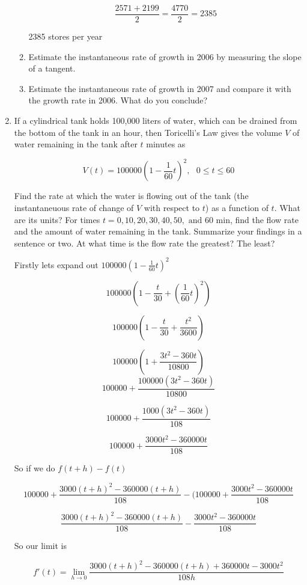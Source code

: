 \documentclass{article}
\begin{document}
\begin{enumerate}
\begin{enumerate}
					$$\frac{2571 + 2199}{2} = \frac{4770}{2} = 2385$$

					2385 stores per year

				\item Estimate the instantaneous rate of growth in 2006 by measuring the slope of a tangent.

				\item Estimate the instantaneous rate of growth in 2007 and compare it 
					with the growth rate in 2006. What do you conclude?
			\end{enumerate}

			\item If a cylindrical tank holds 100,000 liters of water, which can be drained
				from the bottom of the tank in an hour, then Toricelli's Law gives the
				volume $V$ of water remaining in the tank after $t$ minutes as

				$$V(t) = 100000(1 - \frac{1}{60}t)^2, \text{	} 0 \le t \le 60$$

				Find the rate at which the water is flowing out of the tank (the instantaneuous
				rate of change of $V$ with respect to $t$) as a function of $t$. What are
				its units? For times $t = 0, 10, 20, 30, 40, 50, \text{ and } 60 \text{ min}$,
				find the flow rate and the amount of water remaining in the tank. Summarize
				your findings in a sentence or two. At what time is the flow rate the greatest?
				The least?

				Firstly lets expand out $100000(1 - \frac{1}{60}t)^2$

				$$100000(1 - \frac{t}{30} + (\frac{1}{60}t)^2)$$

				$$100000(1 - \frac{t}{30} + \frac{t^2}{3600})$$

				$$100000(1 + \frac{3t^2 - 360t}{10800})$$
				$$100000 + \frac{100000(3t^2 - 360t)}{10800}$$

				$$100000 + \frac{1000(3t^2 - 360t)}{108}$$

				$$100000 + \frac{3000t^2 - 360000t}{108}$$

				So if we do $f(t+h) - f(t)$

				$$100000 + \frac{3000(t+h)^2 - 360000(t+h)}{108} - (100000 + \frac{3000t^2 - 360000t}{108}$$

				$$\frac{3000(t+h)^2 - 360000(t+h)}{108} - \frac{3000t^2 - 360000t}{108}$$

				So our limit is

				$$f'(t) = \lim \limits _{h \to 0} \frac{3000(t+h)^2 - 360000(t+h) + 360000t - 3000t^2}{108h}$$


\end{enumerate}
\end{document}
